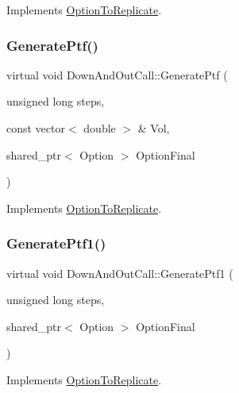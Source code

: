 Implements \hyperlink{classOptionToReplicate_ae744ce948286546566cd424eaa7ea5cb}{Option\+To\+Replicate}.

\hypertarget{classDownAndOutCall_a7f4f73437c1e61cc57f96fadd05a7df1}{}\label{classDownAndOutCall_a7f4f73437c1e61cc57f96fadd05a7df1} 
\subsubsection{\texorpdfstring{Generate\+Ptf()}{GeneratePtf()}\hspace{0.1cm}{\footnotesize\ttfamily [2/2]}}
{\footnotesize\ttfamily virtual void Down\+And\+Out\+Call\+::\+Generate\+Ptf (\begin{DoxyParamCaption}\item[{unsigned long}]{steps,  }\item[{const vector$<$ double $>$ \&}]{Vol,  }\item[{shared\+\_\+ptr$<$ Option $>$}]{Option\+Final }\end{DoxyParamCaption})\hspace{0.3cm}{\ttfamily [virtual]}}



Implements \hyperlink{classOptionToReplicate_a47ad183412648a70cd77957383eb421f}{Option\+To\+Replicate}.

\hypertarget{classDownAndOutCall_a0b8b44b58822b7c4f75e2436b9cf69d7}{}\label{classDownAndOutCall_a0b8b44b58822b7c4f75e2436b9cf69d7} 
\subsubsection{\texorpdfstring{Generate\+Ptf1()}{GeneratePtf1()}}
{\footnotesize\ttfamily virtual void Down\+And\+Out\+Call\+::\+Generate\+Ptf1 (\begin{DoxyParamCaption}\item[{unsigned long}]{steps,  }\item[{shared\+\_\+ptr$<$ Option $>$}]{Option\+Final }\end{DoxyParamCaption})\hspace{0.3cm}{\ttfamily [virtual]}}



Implements \hyperlink{classOptionToReplicate_ad3315e5766faa9be46fa690d8d358b9d}{Option\+To\+Replicate}.

